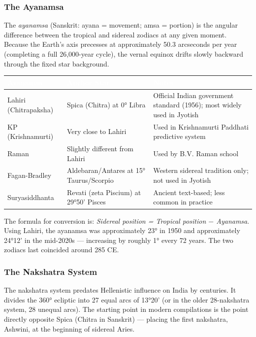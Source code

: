 \documentclass[11pt,letterpaper]{article}
\newcommand{\tableheader}[1]{\textbf{\sffamily\textcolor{white}{#1}}}
\begin{document}
\subsubsection{The Ayanamsa}

The \textit{ayanamsa} (Sanskrit: ayana = movement; amsa = portion) is the angular difference between the tropical and sidereal zodiacs at any given moment. Because the Earth's axis precesses at approximately 50.3 arcseconds per year (completing a full 26,000-year cycle), the vernal equinox drifts slowly backward through the fixed star background.

\begin{center}
\begin{tabularx}{\textwidth}{L{3cm}L{3cm}X}
\toprule
{}
\tableheader{Ayanamsa} & \tableheader{Anchor Star} & \tableheader{Notes} \\
\midrule
Lahiri (Chitrapaksha) & Spica (Chitra) at 0° Libra & Official Indian government standard (1956); most widely used in Jyotish \\
KP (Krishnamurti) & Very close to Lahiri & Used in Krishnamurti Paddhati predictive system \\
Raman & Slightly different from Lahiri & Used by B.V. Raman school \\
Fagan-Bradley & Aldebaran/Antares at 15° Taurus/Scorpio & Western sidereal tradition only; not used in Jyotish \\
Suryasiddhanta & Revati (zeta Piscium) at 29°50' Pisces & Ancient text-based; less common in practice \\
\bottomrule
\end{tabularx}
\end{center}

The formula for conversion is: \textit{Sidereal position = Tropical position $-$ Ayanamsa}. Using Lahiri, the ayanamsa was approximately 23° in 1950 and approximately 24°12' in the mid-2020s --- increasing by roughly 1° every 72 years. The two zodiacs last coincided around 285 CE.

\subsubsection{The Nakshatra System}

The nakshatra system predates Hellenistic influence on India by centuries. It divides the 360° ecliptic into 27 equal arcs of 13°20' (or in the older 28-nakshatra system, 28 unequal arcs). The starting point in modern compilations is the point directly opposite Spica (Chitra in Sanskrit) --- placing the first nakshatra, Ashwini, at the beginning of sidereal Aries.
\end{document}
